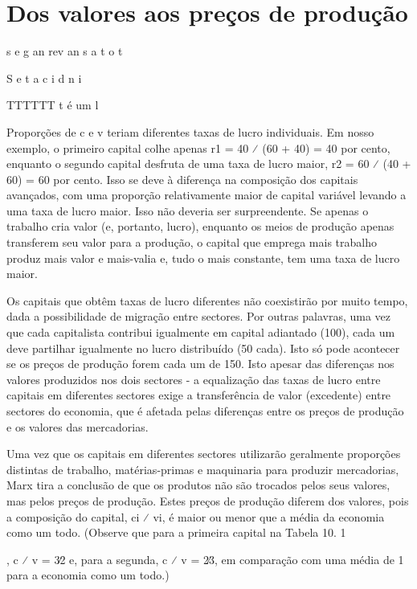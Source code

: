 \section{Dos valores aos preços de produção}
 \par 
s e g an rev an s a t o t
 \par 
S e t a c i d n i
 \par 
TTTTTT t é um l
 \par 
Proporções de c e v teriam diferentes taxas de lucro individuais. Em nosso exemplo, o primeiro capital colhe apenas r1 = {\color{blue}40} ⁄ (60 + {\color{blue}40}) = {\color{blue}40} por cento, enquanto o segundo capital desfruta de uma taxa de lucro maior, r2 = {\color{blue}60} ⁄ (40 + {\color{blue}60}) = {\color{blue}60} por cento. Isso se deve à diferença na composição dos capitais avançados, com uma proporção relativamente maior de capital variável levando a uma taxa de lucro maior. Isso não deveria ser surpreendente. Se apenas o trabalho cria valor (e, portanto, lucro), enquanto os meios de produção apenas transferem seu valor para a produção, o capital que emprega mais trabalho produz mais valor e mais-valia e, tudo o mais constante, tem uma taxa de lucro maior.
 \par 
Os capitais que obtêm taxas de lucro diferentes não coexistirão por muito tempo, dada a possibilidade de migração entre sectores. Por outras palavras, uma vez que cada capitalista contribui igualmente em capital adiantado (100), cada um deve partilhar igualmente no lucro distribuído (50 cada). Isto só pode acontecer se os preços de produção forem cada um de {\color{blue}150}. Isto apesar das diferenças nos valores produzidos nos dois sectores - a equalização das taxas de lucro entre capitais em diferentes sectores exige a transferência de valor (excedente) entre sectores do economia, que é afetada pelas diferenças entre os preços de produção e os valores das mercadorias.
 \par 
Uma vez que os capitais em diferentes sectores utilizarão geralmente proporções distintas de trabalho, matérias-primas e maquinaria para produzir mercadorias, Marx tira a conclusão de que os produtos não são trocados pelos seus valores, mas pelos preços de produção. Estes preços de produção diferem dos valores, pois a composição do capital, ci ⁄ vi, é maior ou menor que a média da economia como um todo. (Observe que para a primeira capital na Tabela {\color{blue}10}. {\color{blue} 1 } {\par} , c ⁄ v = 3∕2 e, para a segunda, c ⁄ v = 2∕3, em comparação com uma média de {\color{blue}1} para a economia como um todo.)
 \par 
